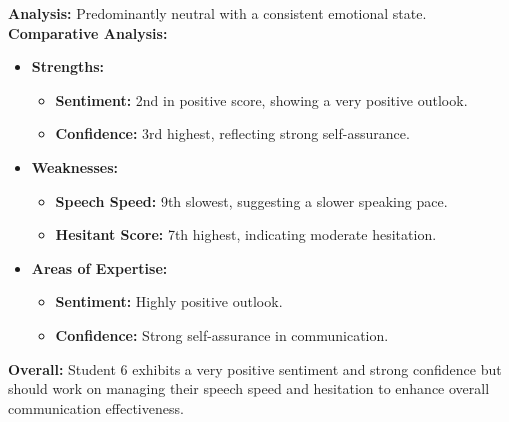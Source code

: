 \documentclass{article}
\begin{document}
    \textbf{Analysis:} Predominantly neutral with a consistent emotional state.
    \vspace{0.1in}
\textbf{Comparative Analysis:}
\begin{itemize}
    \item \textbf{Strengths:}
    \begin{itemize}
        \item \textbf{Sentiment:} 2nd in positive score, showing a very positive outlook.
        \item \textbf{Confidence:} 3rd highest, reflecting strong self-assurance.
    \end{itemize}
    \item \textbf{Weaknesses:}
    \begin{itemize}
        \item \textbf{Speech Speed:} 9th slowest, suggesting a slower speaking pace.
        \item \textbf{Hesitant Score:} 7th highest, indicating moderate hesitation.
    \end{itemize}
    \item \textbf{Areas of Expertise:}
    \begin{itemize}
        \item \textbf{Sentiment:} Highly positive outlook.
        \item \textbf{Confidence:} Strong self-assurance in communication.
    \end{itemize}
\end{itemize}

\textbf{Overall:} Student 6 exhibits a very positive sentiment and strong confidence but should work on managing their speech speed and hesitation to enhance overall communication effectiveness.
\vspace{0.3in}
\end{document}
